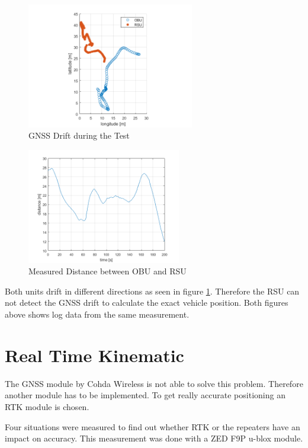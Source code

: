 \begin{figure}[htb]
	\centering
	\includegraphics[width=0.65\textwidth]{images/OBURSUDrift}
	\caption{GNSS Drift during the Test}
	\label{fig:OBURSUDrift}
\end{figure}

\begin{figure}[htb]
	\centering
	\includegraphics[width=0.6\textwidth]{images/diffmessung_pp}
	\caption{Measured Distance between OBU and RSU}
	\label{fig:diffmessung}
\end{figure}

Both units drift in different directions as seen in figure \ref{fig:OBURSUDrift}. Therefore the RSU can not detect the GNSS drift to calculate the exact vehicle position. Both figures above shows log data from the same measurement.

\clearpage
\pagebreak

\section{Real Time Kinematic}

The GNSS module by Cohda Wireless is not able to solve this problem. Therefore another module has to be implemented. To get really accurate positioning an RTK module is chosen.

Four situations were measured to find out whether RTK or the repeaters have an impact on accuracy. This measurement was done with a ZED F9P u-blox module. 

